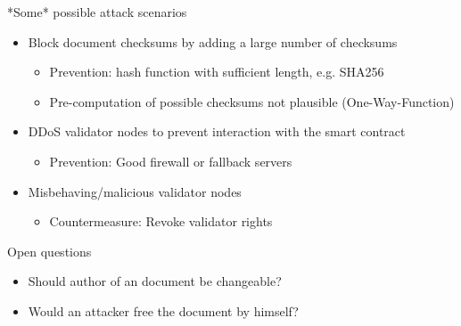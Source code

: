 \documentclass[10pt]{beamer}
\begin{document}
\begin{frame}{*Some* possible attack scenarios}
	\begin{itemize}
		\item Block document checksums by adding a large number of checksums
		\begin{itemize}
			\item Prevention: hash function with sufficient length, e.g. SHA256
			\item Pre-computation of possible checksums not plausible (One-Way-Function)
		\end{itemize}
		\item DDoS validator nodes to prevent interaction with the smart contract
		\begin{itemize}
			\item Prevention: Good firewall or fallback servers
		\end{itemize}
		\item Misbehaving/malicious validator nodes
		\begin{itemize}
			\item Countermeasure: Revoke validator rights
		\end{itemize}
	\end{itemize}
\end{frame}

\begin{frame}{Open questions}
	\begin{itemize}
		\item Should author of an document be changeable?
		\item Would an attacker free the document by himself?
	\end{itemize}
\end{frame}

\end{document}
